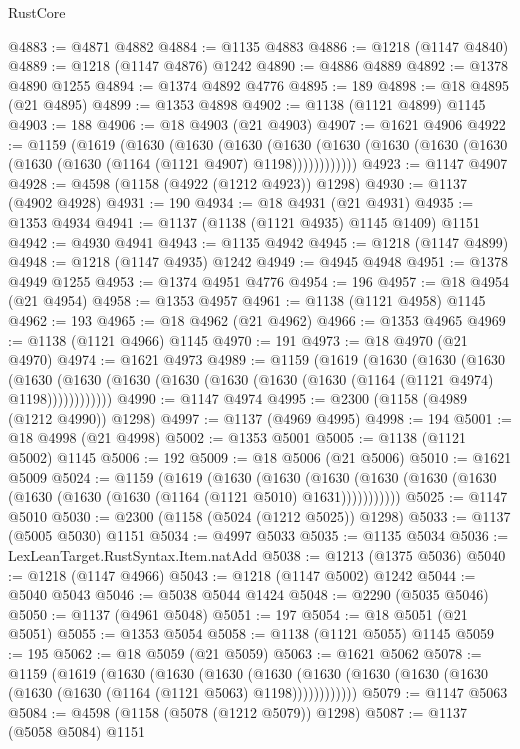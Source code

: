 \begin{lexlean}{RustCore}
\begin{coremodule}
@4883 := @4871 @4882
@4884 := @1135 @4883
@4886 := @1218 (@1147 @4840)
@4889 := @1218 (@1147 @4876) @1242
@4890 := @4886 @4889
@4892 := @1378 @4890 @1255
@4894 := @1374 @4892 @4776
@4895 := 189
@4898 := @18 @4895 (@21 @4895)
@4899 := @1353 @4898
@4902 := @1138 (@1121 @4899) @1145
@4903 := 188
@4906 := @18 @4903 (@21 @4903)
@4907 := @1621 @4906
@4922 := @1159
    (@1619
      (@1630
        (@1630
          (@1630
            (@1630 (@1630 (@1630 (@1630 (@1630 (@1630 (@1630 (@1164 (@1121 @4907) @1198))))))))))))
@4923 := @1147 @4907
@4928 := @4598 (@1158 (@4922 (@1212 @4923)) @1298)
@4930 := @1137 (@4902 @4928)
@4931 := 190
@4934 := @18 @4931 (@21 @4931)
@4935 := @1353 @4934
@4941 := @1137 (@1138 (@1121 @4935) @1145 @1409) @1151
@4942 := @4930 @4941
@4943 := @1135 @4942
@4945 := @1218 (@1147 @4899)
@4948 := @1218 (@1147 @4935) @1242
@4949 := @4945 @4948
@4951 := @1378 @4949 @1255
@4953 := @1374 @4951 @4776
@4954 := 196
@4957 := @18 @4954 (@21 @4954)
@4958 := @1353 @4957
@4961 := @1138 (@1121 @4958) @1145
@4962 := 193
@4965 := @18 @4962 (@21 @4962)
@4966 := @1353 @4965
@4969 := @1138 (@1121 @4966) @1145
@4970 := 191
@4973 := @18 @4970 (@21 @4970)
@4974 := @1621 @4973
@4989 := @1159
    (@1619
      (@1630
        (@1630
          (@1630
            (@1630 (@1630 (@1630 (@1630 (@1630 (@1630 (@1630 (@1164 (@1121 @4974) @1198))))))))))))
@4990 := @1147 @4974
@4995 := @2300 (@1158 (@4989 (@1212 @4990)) @1298)
@4997 := @1137 (@4969 @4995)
@4998 := 194
@5001 := @18 @4998 (@21 @4998)
@5002 := @1353 @5001
@5005 := @1138 (@1121 @5002) @1145
@5006 := 192
@5009 := @18 @5006 (@21 @5006)
@5010 := @1621 @5009
@5024 := @1159
    (@1619
      (@1630
        (@1630
          (@1630 (@1630 (@1630 (@1630 (@1630 (@1630 (@1630 (@1164 (@1121 @5010) @1631)))))))))))
@5025 := @1147 @5010
@5030 := @2300 (@1158 (@5024 (@1212 @5025)) @1298)
@5033 := @1137 (@5005 @5030) @1151
@5034 := @4997 @5033
@5035 := @1135 @5034
@5036 := LexLeanTarget.RustSyntax.Item.natAdd
@5038 := @1213 (@1375 @5036)
@5040 := @1218 (@1147 @4966)
@5043 := @1218 (@1147 @5002) @1242
@5044 := @5040 @5043
@5046 := @5038 @5044 @1424
@5048 := @2290 (@5035 @5046)
@5050 := @1137 (@4961 @5048)
@5051 := 197
@5054 := @18 @5051 (@21 @5051)
@5055 := @1353 @5054
@5058 := @1138 (@1121 @5055) @1145
@5059 := 195
@5062 := @18 @5059 (@21 @5059)
@5063 := @1621 @5062
@5078 := @1159
    (@1619
      (@1630
        (@1630
          (@1630
            (@1630 (@1630 (@1630 (@1630 (@1630 (@1630 (@1630 (@1164 (@1121 @5063) @1198))))))))))))
@5079 := @1147 @5063
@5084 := @4598 (@1158 (@5078 (@1212 @5079)) @1298)
@5087 := @1137 (@5058 @5084) @1151

\end{coremodule}
\end{lexlean}
